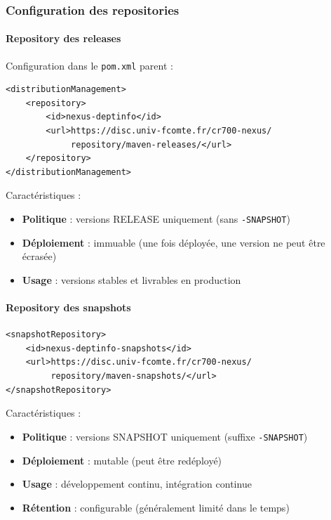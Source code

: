 \subsubsection{Configuration des repositories}

\paragraph{Repository des releases}

Configuration dans le \texttt{pom.xml} parent :
\begin{lstlisting}[language=enhancedxml, caption=Configuration du repository releases]
<distributionManagement>
    <repository>
        <id>nexus-deptinfo</id>
        <url>https://disc.univ-fcomte.fr/cr700-nexus/
             repository/maven-releases/</url>
    </repository>
</distributionManagement>
\end{lstlisting}

Caractéristiques :
\begin{itemize}
    \item \textbf{Politique} : versions RELEASE uniquement (sans \texttt{-SNAPSHOT})
    \item \textbf{Déploiement} : immuable (une fois déployée, une version ne peut être écrasée)
    \item \textbf{Usage} : versions stables et livrables en production
\end{itemize}

\paragraph{Repository des snapshots}

\vspace{0.3cm}
\begin{lstlisting}[language=enhancedxml, caption=Configuration du repository snapshots]
<snapshotRepository>
    <id>nexus-deptinfo-snapshots</id>
    <url>https://disc.univ-fcomte.fr/cr700-nexus/
         repository/maven-snapshots/</url>
</snapshotRepository>
\end{lstlisting}

Caractéristiques :
\begin{itemize}
    \item \textbf{Politique} : versions SNAPSHOT uniquement (suffixe \texttt{-SNAPSHOT})
    \item \textbf{Déploiement} : mutable (peut être redéployé)
    \item \textbf{Usage} : développement continu, intégration continue
    \item \textbf{Rétention} : configurable (généralement limité dans le temps)
\end{itemize}

